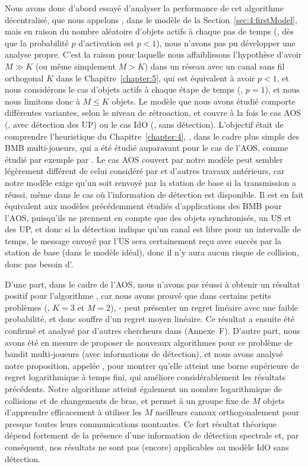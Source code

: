 \begin{resume_fr}
Nous avons donc d'abord essayé d'analyser la performance de cet algorithme décentralisé, que nous appelons \Selfish, dans le modèle de la Section~\ref{sec:4:firstModel},
mais en raison du nombre aléatoire d'objets actifs à chaque pas de temps (\ie, dès que la probabilité $p$ d'activation est $p < 1$), nous n'avons pas pu développer une analyse propre.
%
C'est la raison pour laquelle nous affaiblissons l'hypothèse d'avoir $M \gg K$ (ou même simplement $M > K$) dans un réseau avec un canal sans fil orthogonal $K$ dans le Chapitre~\ref{chapter:5}, qui est équivalent à avoir $p < 1$, et nous considérons le cas d'objets actifs à chaque étape de temps (\ie, $p=1$), et nous nous limitons donc à $M \leq K$ objets.
Le modèle que nous avons étudié comporte différentes variantes, selon le niveau de rétroaction, et couvre à la fois le cas AOS (\ie, avec détection des UP) ou le cas IdO (\ie, sans détection).
L'objectif était de comprendre l'heuristique du Chapitre~\ref{chapter:4}, \Selfish, dans le cadre plus simple des BMB multi-joueurs, qui a été étudié auparavant pour le cas de l'AOS, comme étudié par exemple par \cite{Zhao10,Anandkumar10,Anandkumar11}.
%
Le cas AOS couvert par notre modèle peut sembler légèrement différent de celui considéré par \cite{Jouini10} et d'autres travaux antérieurs,
car notre modèle exige qu'un \Ack{} soit renvoyé par la station de base si la transmission a réussi, même dans le cas où l'information de détection est disponible.
Il est en fait équivalent aux modèles précédemment étudiés d'applications des BMB pour l'AOS, puisqu'ils ne prennent en compte que des objets synchronisés, un US et des UP, et donc si la détection indique qu'un canal est libre pour un intervalle de temps, le message envoyé par l'US sera certainement reçu avec succès par la station de base (dans le modèle idéal), donc il n'y aura aucun risque de collision, donc pas besoin d'\Ack.


D'une part, dans le cadre de l'AOS, nous n'avons pas réussi à obtenir un résultat positif pour l'algorithme \Selfish, car nous avons prouvé que dans certains petits problèmes (\eg, $K=3$ et $M=2$), \Selfish-\UCB{} peut présenter un regret linéaire avec une faible probabilité, et donc souffre d'un regret moyen linéaire.
Ce résultat a ensuite été confirmé et analysé par d'autres chercheurs dans \cite{BoursierPerchet18} (Annexe~F).
%
D'autre part, nous avons été en mesure de proposer de nouveaux algorithmes pour ce problème de bandit multi-joueurs (avec informations de détection), et nous avons analysé notre proposition, appelée \MCTopM, pour montrer qu'elle atteint une borne supérieure de regret logarithmique à temps fini, qui améliore considérablement les résultats précédents.
Notre algorithme atteint également un nombre logarithmique de collisions et de changements de bras, et permet à un groupe fixe de $M$ objets d'apprendre efficacement à utiliser les $M$ meilleurs canaux orthogonalement pour presque toutes leurs communications montantes.
%
Ce fort résultat théorique dépend fortement de la présence d'une information de détection spectrale et, par conséquent, nos résultats ne sont pas (encore) applicables au modèle IdO sans détection.



\end{resume_fr}
